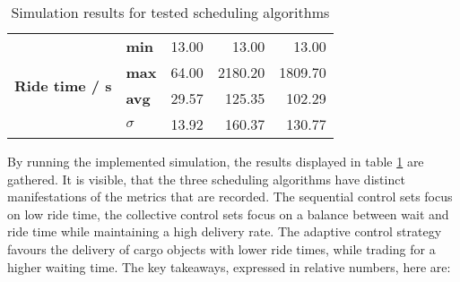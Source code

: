 \begin{table}[]
\begin{tabular}{llrrr}
\multirow{4}{*}{\textbf{Ride time / s}}        & \textbf{min}        & 13.00                                                                                                                                             & 13.00                                                                                                                                             & 13.00                                                                                                                                           \\
                                               & \textbf{max}        & 64.00                                                                                                                                             & 2180.20                                                                                                                                           & 1809.70                                                                                                                                         \\
                                               & \textbf{avg}        & 29.57                                                                                                                                             & 125.35                                                                                                                                            & 102.29                                                                                                                                          \\
                                               & \textbf{$ \sigma $} & 13.92                                                                                                                                             & 160.37                                                                                                                                            & 130.77                                                                                                                                         
\end{tabular}
\caption{\label{tab:impl:simulationresults} Simulation results for tested scheduling algorithms}
\end{table}
\endgroup

By running the  implemented simulation, the results displayed in table \ref{tab:impl:simulationresults} are gathered.
It is visible, that the three scheduling algorithms have distinct manifestations of the metrics that are recorded.
The sequential control sets focus on low ride time, the collective control sets focus on a balance between wait and ride time while maintaining a high delivery rate. 
The adaptive control strategy favours the delivery of cargo objects with lower ride times, while trading for a higher waiting time.
The key takeaways, expressed in relative numbers, here are:

